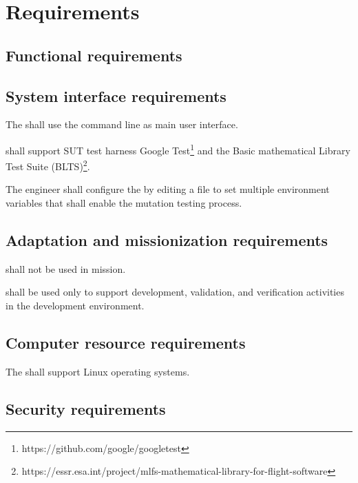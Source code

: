 \chapter{Requirements}

\section{Functional requirements}
\label{sec:requirements}






\section{System interface requirements}

\RQ{} The \FAQAS shall use the command line as main user interface.

\RQ{} \FAQAS shall support SUT test harness Google Test\footnote{https://github.com/google/googletest} and the Basic mathematical Library Test Suite (BLTS)\footnote{https://essr.esa.int/project/mlfs-mathematical-library-for-flight-software}.

\RQ{} The engineer shall configure the \FAQAS by editing a file to set multiple environment variables that shall enable the mutation testing process.



\section{Adaptation and missionization requirements}

\RQ{} \FAQAS shall not be used in mission.

\RQ{} \FAQAS shall be used only to support development, validation, and verification activities in the development environment. 




\section{Computer resource requirements}


\RQ{} The \FAQAS shall support Linux operating systems.



\section{Security requirements }

